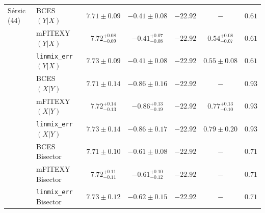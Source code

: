 \documentclass[preprint2]{emulateapj}
\begin{document}
\begin{table}
\begin{tabular}{llccccc}
S\'ersic (44) & BCES $(Y|X)$   & $7.71 \pm 0.09$ & $-0.41 \pm 0.08$ & $-22.92$ & $-$    & $0.61$ \\
              & mFITEXY $(Y|X)$   & $7.72^{+0.08}_{-0.09}$ & $-0.41^{+0.07}_{-0.08}$ & $-22.92$ & $0.54^{+0.08}_{-0.07}$ & $0.61$ \\
              & {\tt linmix\_err} $(Y|X)$  & $7.73 \pm 0.09$ & $-0.41 \pm 0.08$ & $-22.92$ & $0.55 \pm 0.08$ & $0.61$ \\ [0.5em]
              & BCES $(X|Y)$   & $7.71 \pm 0.14$ & $-0.86 \pm 0.16$ & $-22.92$ & $-$    & $0.93$ \\
              & mFITEXY $(X|Y)$   & $7.72^{+0.14}_{-0.13}$ & $-0.86^{+0.13}_{-0.19}$ & $-22.92$ & $0.77^{+0.13}_{-0.10}$ & $0.93$ \\
              & {\tt linmix\_err} $(X|Y)$  & $7.73 \pm 0.14$ & $-0.86 \pm 0.17$ & $-22.92$ & $0.79 \pm  0.20$ & $0.93$ \\ [0.5em]
              & BCES Bisector  & $7.71 \pm 0.10$  & $-0.61 \pm 0.08$ & $-22.92$ & $-$    & $0.71$ \\
              & mFITEXY Bisector  & $7.72^{+0.11}_{-0.11}$ & $-0.61^{+0.10}_{-0.12}$ & $-22.92$ & $-$                    & $0.71$ \\
              & {\tt linmix\_err} Bisector & $7.73 \pm 0.12$ & $-0.62 \pm 0.15$ & $-22.92$ & $-$    & $0.71$ \\ [0.5em]


\end{tabular}
\end{table}
\end{document}
